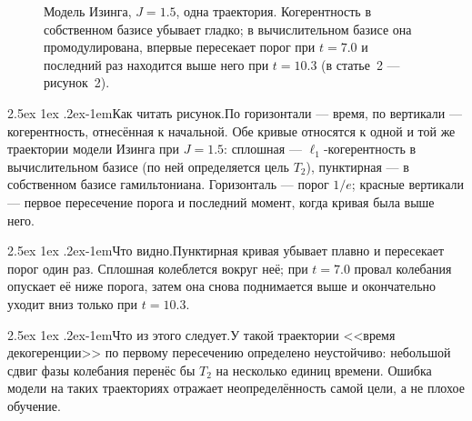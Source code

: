 \documentclass[12pt,a4paper]{report}
\makeatletter
\renewcommand\paragraph{\@startsection{paragraph}{4}{\z@}%
  {2.5ex \@plus1ex \@minus.2ex}{-1em}{\normalfont\normalsize\bfseries}}
\numberwithin{equation}{chapter}
\newcommand{\figread}{\paragraph{Как читать рисунок.}}
\newcommand{\figsee}{\paragraph{Что видно.}}
\newcommand{\figgen}{\paragraph{Что из этого следует.}}
\makeatother
\begin{document}
\begin{figure}[h]
\centering
{}
\caption{Модель Изинга, $J=1.5$, одна траектория. Когерентность в собственном
базисе убывает гладко; в вычислительном базисе она промодулирована, впервые
пересекает порог при $t=7.0$ и последний раз находится выше него при
$t=10.3$ (в статье~2 --- рисунок~2).}
\label{fig:r9ex}
\end{figure}

\figread По горизонтали --- время, по вертикали --- когерентность, отнесённая
к начальной. Обе кривые относятся к одной и той же траектории модели Изинга
при $J=1.5$: сплошная --- $\ell_1$-когерентность в вычислительном базисе (по
ней определяется цель $T_2$), пунктирная --- в собственном базисе
гамильтониана. Горизонталь --- порог $1/e$; красные вертикали --- первое
пересечение порога и последний момент, когда кривая была выше него.

\figsee Пунктирная кривая убывает плавно и пересекает порог один раз.
Сплошная колеблется вокруг неё; при $t=7.0$ провал колебания опускает её
ниже порога, затем она снова поднимается выше и окончательно уходит вниз
только при $t=10.3$.

\figgen У такой траектории <<время декогеренции>> по первому пересечению
определено неустойчиво: небольшой сдвиг фазы колебания перенёс бы $T_2$ на
несколько единиц времени. Ошибка модели на таких траекториях отражает
неопределённость самой цели, а не плохое обучение.
\end{document}
